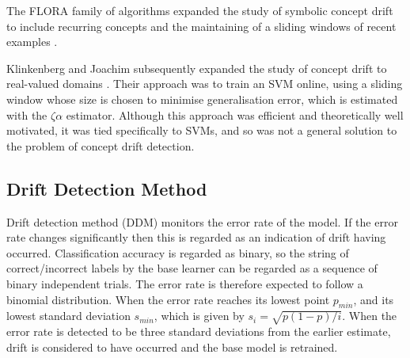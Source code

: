 The FLORA family of algorithms expanded the study of symbolic concept drift to include recurring concepts and the maintaining of a sliding windows of recent examples \cite{FLORA}. 

Klinkenberg and Joachim subsequently expanded the study of concept drift to real-valued domains \cite{SVM_detection}. Their approach was to train an SVM online, using a sliding window whose size is chosen to minimise generalisation error, which is estimated with the $\zeta\alpha$ estimator. Although this approach was efficient and theoretically well motivated, it was tied specifically to SVMs, and so was not a general solution to the problem of concept drift detection.

\subsection{Drift Detection Method}

Drift detection method (DDM) monitors the error rate of the model. If the error rate changes significantly then this is regarded as an indication of drift having occurred. Classification accuracy is regarded as binary, so the string of correct/incorrect labels by the base learner can be regarded as a sequence of binary independent trials. The error rate is therefore expected to follow a binomial distribution. When the error rate reaches its lowest point $p_{min}$, and its lowest standard deviation $s_{min}$, which is given by $s_i = \sqrt{p(1-p)/i}$. When the error rate is detected to be three standard deviations from the earlier estimate, drift is considered to have occurred and the base model is retrained.

